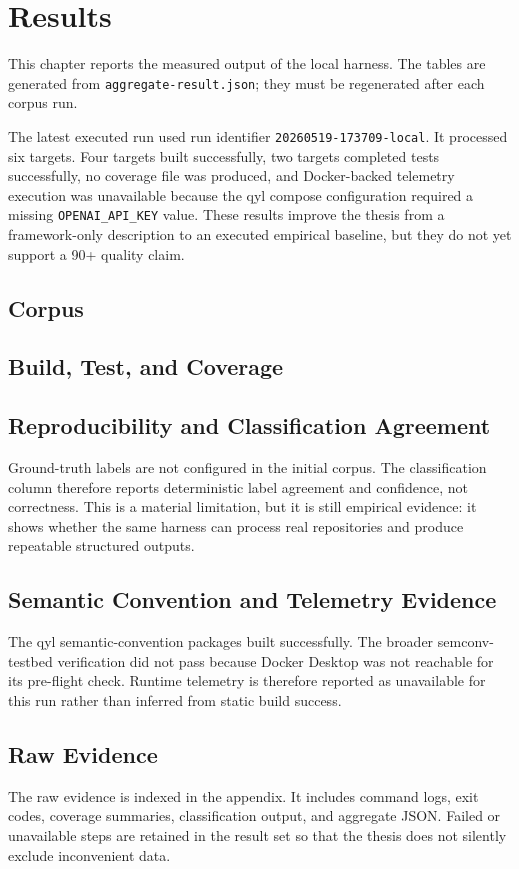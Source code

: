 \chapter{Results}

This chapter reports the measured output of the local harness. The tables are generated from \texttt{aggregate-result.json}; they must be regenerated after each corpus run.

The latest executed run used run identifier \texttt{20260519-173709-local}. It processed six targets. Four targets built successfully, two targets completed tests successfully, no coverage file was produced, and Docker-backed telemetry execution was unavailable because the qyl compose configuration required a missing \texttt{OPENAI\_API\_KEY} value. These results improve the thesis from a framework-only description to an executed empirical baseline, but they do not yet support a 90+ quality claim.

\section{Corpus}


\section{Build, Test, and Coverage}




\section{Reproducibility and Classification Agreement}


Ground-truth labels are not configured in the initial corpus. The classification column therefore reports deterministic label agreement and confidence, not correctness. This is a material limitation, but it is still empirical evidence: it shows whether the same harness can process real repositories and produce repeatable structured outputs.

\section{Semantic Convention and Telemetry Evidence}


The qyl semantic-convention packages built successfully. The broader semconv-testbed verification did not pass because Docker Desktop was not reachable for its pre-flight check. Runtime telemetry is therefore reported as unavailable for this run rather than inferred from static build success.

\section{Raw Evidence}

The raw evidence is indexed in the appendix. It includes command logs, exit codes, coverage summaries, classification output, and aggregate JSON. Failed or unavailable steps are retained in the result set so that the thesis does not silently exclude inconvenient data.
